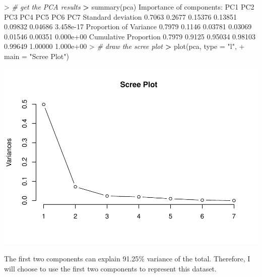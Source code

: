 \documentclass[
]{article}
\newenvironment{Shaded}{\begin{snugshade}}{\end{snugshade}}
\newcommand{\AttributeTok}[1]{\textcolor[rgb]{0.77,0.63,0.00}{#1}}
\newcommand{\CommentTok}[1]{\textcolor[rgb]{0.56,0.35,0.01}{\textit{#1}}}
\newcommand{\ErrorTok}[1]{\textcolor[rgb]{0.64,0.00,0.00}{\textbf{#1}}}
\newcommand{\FloatTok}[1]{\textcolor[rgb]{0.00,0.00,0.81}{#1}}
\newcommand{\FunctionTok}[1]{\textcolor[rgb]{0.00,0.00,0.00}{#1}}
\newcommand{\NormalTok}[1]{#1}
\newcommand{\SpecialCharTok}[1]{\textcolor[rgb]{0.00,0.00,0.00}{#1}}
\newcommand{\StringTok}[1]{\textcolor[rgb]{0.31,0.60,0.02}{#1}}
\begin{document}
\begin{Shaded}
\begin{Highlighting}[]
\SpecialCharTok{\textgreater{}} \CommentTok{\# get the PCA results}
\ErrorTok{\textgreater{}} \FunctionTok{summary}\NormalTok{(pca)}
\NormalTok{Importance of components}\SpecialCharTok{:}
\NormalTok{                          PC1    PC2     PC3     PC4     PC5     PC6       PC7}
\NormalTok{Standard deviation     }\FloatTok{0.7063} \FloatTok{0.2677} \FloatTok{0.15376} \FloatTok{0.13851} \FloatTok{0.09832} \FloatTok{0.04686} \FloatTok{3.458e{-}17}
\NormalTok{Proportion of Variance }\FloatTok{0.7979} \FloatTok{0.1146} \FloatTok{0.03781} \FloatTok{0.03069} \FloatTok{0.01546} \FloatTok{0.00351} \FloatTok{0.000e+00}
\NormalTok{Cumulative Proportion  }\FloatTok{0.7979} \FloatTok{0.9125} \FloatTok{0.95034} \FloatTok{0.98103} \FloatTok{0.99649} \FloatTok{1.00000} \FloatTok{1.000e+00}
\SpecialCharTok{\textgreater{}} \CommentTok{\# draw the scree plot }
\ErrorTok{\textgreater{}} \FunctionTok{plot}\NormalTok{(pca, }\AttributeTok{type =} \StringTok{"l"}\NormalTok{, }
\SpecialCharTok{+}      \AttributeTok{main =} \StringTok{"Scree Plot"}\NormalTok{)}
\end{Highlighting}
\end{Shaded}

\includegraphics[width=0.7\linewidth,height=0.5\textheight]{HUDM6122-Homework_03-Chenguang-Pan_files/figure-latex/unnamed-chunk-4-1}

The first two components can explain 91.25\% variance of the total.
Therefore, I will choose to use the first two components to represent
this dataset.
\end{document}
